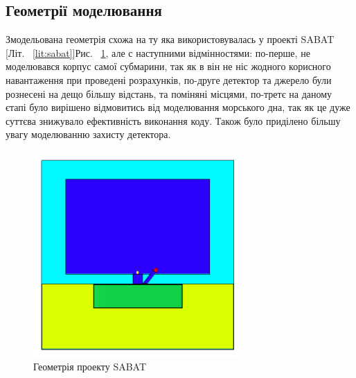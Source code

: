 \documentclass[a4paper, 14pt]{article}
\numberwithin{equation}{section}
\numberwithin{table}{section}
\begin{document}
\subsection {Геометрії моделювання}
Змодельована геометрія схожа на ту яка використовувалась у проекті SABAT [Літ. ~\ref{lit:sabat}]Рис. ~\ref{ris:SabatG}, але с наступними відмінностями: по-перше, не моделювався корпус самої субмарини, так як в він не ніс жодного корисного навантаження при проведені розрахунків, по-друге детектор та джерело були рознесені на дещо більшу відстань, та поміняні місцями, по-третє на даному єтапі було вирішено відмовитись від моделювання морського дна, так як це дуже суттєва знижувало ефективність виконання коду. Також було приділено більшу увагу моделюванню захисту детектора.
\begin{figure}[!hbt]
	\centering \includegraphics[width=0.7\textwidth]{images/sabatGeometry.png}
	\caption{Геометрія проекту SABAT} 
	\label{ris:SabatG}	
\end{figure}
\end{document}
